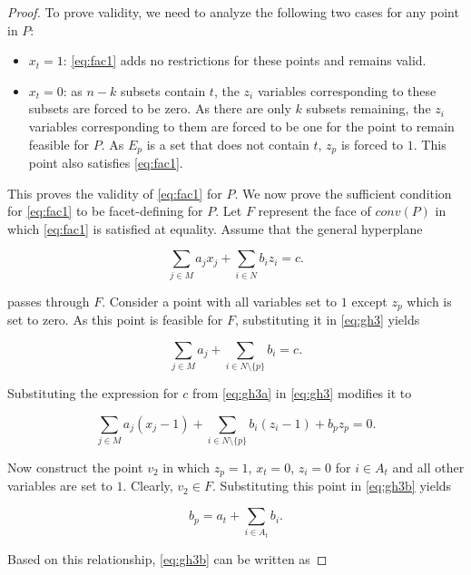 \documentclass[12pt]{article}
\begin{document}
\begin{proof}
To prove validity, we need to analyze the following two cases for any point in $P$:

\begin{itemize}
\item $x_t = 1$: \eqref{eq:fac1} adds no restrictions for these points and remains valid.
\item $x_t = 0$: as $n-k$ subsets contain $t$, the $z_i$ variables corresponding to these subsets are forced to be zero. As there are only $k$ subsets remaining, the $z_i$ variables corresponding to them are forced to be one for the point to remain feasible for $P$. As $E_p$ is a set that does not contain $t$, $z_p$ is forced to $1$. This point also satisfies \eqref{eq:fac1}.
\end{itemize}

This proves the validity of \eqref{eq:fac1} for $P$. We now prove the sufficient condition for \eqref{eq:fac1} to be facet-defining for $P$. Let $F$ represent the face of $conv(P)$ in which \eqref{eq:fac1} is satisfied at equality. Assume that the general hyperplane

\begin{equation} \label{eq:gh3}
\sum_{j \in M} a_j x_j + \sum_{i \in N} b_i z_i = c.
\end{equation}

passes through $F$. Consider a point with all variables set to $1$ except $z_p$ which is set to zero. As this point is feasible for $F$, substituting it in \eqref{eq:gh3} yields

\begin{equation} \label{eq:gh3a}
\sum_{j \in M} a_j + \sum_{i \in N \setminus \{p\}} b_i = c.
\end{equation}

Substituting the expression for $c$ from \eqref{eq:gh3a} in \eqref{eq:gh3} modifies it to

\begin{equation} \label{eq:gh3b}
\sum_{j \in M} a_j (x_j - 1) + \sum_{i \in N \setminus \{p\}} b_i (z_i - 1) + b_p z_p = 0.
\end{equation}

Now construct the point $v_2$ in which $z_p = 1$, $x_t = 0$, $z_i = 0$ for $i \in A_t$ and all other variables are set to $1$. Clearly, $v_2 \in F$. Substituting this point in \eqref{eq:gh3b} yields

\[ b_p = a_t + \sum_{i \in A_t} b_i.\]

Based on this relationship, \eqref{eq:gh3b} can be written as


\end{proof}
\end{document}

